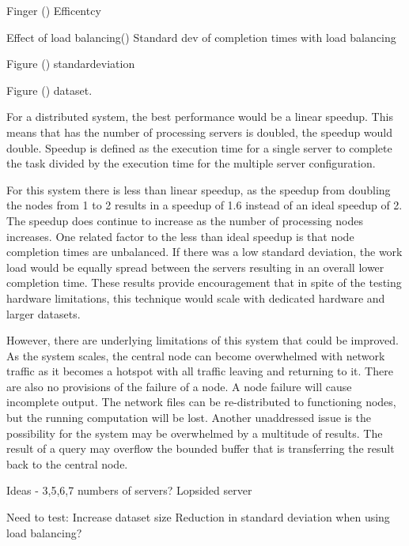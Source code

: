 \documentclass{article}
\begin{document}
\begin{multicols}{2}
Finger () Efficentcy

Effect of load balancing()
Standard dev of completion times with load balancing


Figure () standardeviation


Figure () dataset.





For a distributed system, the best performance would be a linear speedup.  This means that has the number of processing servers is doubled, the speedup would double. Speedup is defined as the execution time for a single server to complete the task divided by the execution time for the multiple server configuration.

For this system there is less than linear speedup, as the speedup from doubling the nodes from 1 to 2 results in a speedup of 1.6 instead of an ideal speedup of 2.  The speedup does continue to increase as the number of processing nodes increases. One related factor to the less than ideal speedup is that node completion times are unbalanced. If there was a low standard deviation, the work load would be equally spread between the servers resulting in an overall lower completion time.  %
These results provide encouragement that in spite of the testing hardware limitations, this technique would scale with dedicated hardware and larger datasets.

However, there are underlying limitations of this system that could be improved.  As the system scales, the central node can become overwhelmed with network traffic as it becomes a hotspot with all traffic leaving and returning to it. There are also no provisions of the failure of a node.  A node failure will cause incomplete output.  The network files can be re-distributed to functioning nodes, but the running computation will be lost.  Another unaddressed issue is the possibility for the system may be overwhelmed by a multitude of results. The result of a query may overflow the bounded buffer that is transferring the result back to the central node.  





Ideas - 3,5,6,7 numbers of servers?
Lopsided server





Need to test:
Increase dataset size
Reduction in standard deviation
when using load balancing?


\end{multicols}
\end{document}
